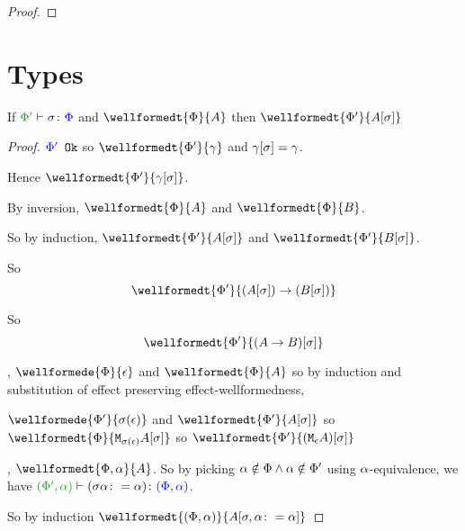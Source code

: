\documentclass{report}
\begin{document}
\begin{framed}
\begin{proof}
    \end{proof}
    
\end{framed}\section{Types}

\begin{theorem}
    If $\typerelation{\P'}{\si}{\P}$ and $\wellformedt{\P}{A}$ then $\wellformedt{\P'}{A\ssi}$
\end{theorem}


\begin{framed}    
    \begin{proof}
        \case{\tground}
        
        ${\color{blue} \Phi'} \texttt{ Ok}$ so $\wellformedt{\P'}{\g}$ and $\gamma[\sigma]=\gamma$.
        
        Hence $\wellformedt{\P'}{\g\ssi}$.
        
        \case{\tfun}
        
        By inversion,  $\wellformedt{\P}{A}$ and $\wellformedt{\P}{B}$.
        
        So by induction, $\wellformedt{\P'}{A\ssi}$ and $\wellformedt{\P'}{B\ssi}$.
        
        So \begin{equation}
            \wellformedt{\P'}{\fntype{(A\ssi)}{(B\ssi)}}
        \end{equation}
        
        So \begin{equation}
            \wellformedt{\P'}{(\ab)\ssi}
        \end{equation}
        
        
        
        \case{\teffect}
        
        \bi, $\wellformede{\P}{\e}$ and $\wellformedt{\P}{A}$ so by induction and substitution of effect preserving effect-wellformedness, 
        
        $\wellformede{\P'}{\si(\e)}$ and $\wellformedt{\P'}{A\ssi}$ so $\wellformedt{\P}{\M{\si(\e)}{A\ssi}}$ so $\wellformedt{\P'}{(\mea)\ssi}$
        
        \case{\tquant}
        \bi, $\wellformedt{\P,\a}{A}$. So by picking $\alpha\notin\Phi\wedge\alpha\notin\Phi'$ using $\alpha$-equivalence, we have $\typerelation{(\P',\a)}{(\si\a\setto\a)}{(\P,\a)}$.
        
        So by induction $\wellformedt{(\P, \a)}{A\sub{\si,\a\setto\a}}$
        

\end{proof}
\end{framed}
\end{document}
